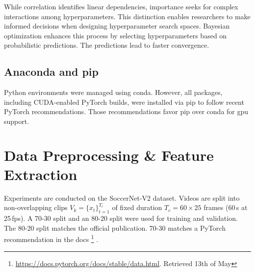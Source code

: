 While correlation identifies linear dependencies, importance seeks for complex interactions among hyperparameters. This distinction enables researchers to make informed decisions when designing hyperparameter search spaces. Bayesian optimization enhances this process by selecting hyperparameters based on probabilistic predictions. The predictions lead to faster convergence.

\subsection{Anaconda and pip}
\label{ssec:conda_pip}
Python environments were managed using conda. However, all packages, including CUDA-enabled PyTorch builds, were installed via pip to follow recent PyTorch recommendations. Those recommendations favor pip over conda for \acrshort{gpu} support.

\section{Data Preprocessing \& Feature Extraction}
\label{sec:preprocessing}

Experiments are conducted on the SoccerNet-V2 dataset\cite{deliege_soccernet-v2_dataset_2021}. Videos are split into non-overlapping clips $V_k=\{x_t\}_{t=1}^{T_c}$ of fixed duration $T_c=60\!\times\!25$ frames (60\,s at 25\,fps). A 70-30 split and an 80-20 split were used for training and validation. The 80-20 split matches the official publication. 70-30 matches a PyTorch recommendation in the docs
\footnote{
\url{https://docs.pytorch.org/docs/stable/data.html}. 
Retrieved 13th of May}
.







